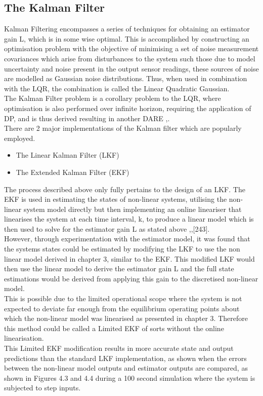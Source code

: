 \documentclass[12pt,a4paper,twoside]{report}
\begin{document}
			\subsection*{The Kalman Filter}
				
				Kalman Filtering encompasses a series of techniques for obtaining an estimator gain L, which is in some wise optimal. This is accomplished by constructing an optimisation problem with the objective of minimising a set of noise measurement covariances which arise from disturbances to the system such those due to model uncertainty and noise present in the output sensor readings, these sources of noise are modelled as Gaussian noise distributions. Thus, when used in combination with the LQR, the combination is called the Linear Quadratic Gaussian.  
				\\
				The Kalman Filter problem is a corollary problem to the LQR, where optimisation is also performed over infinite horizon, requiring the application of DP, and is thus derived resulting in another DARE \cite{18},\cite{21}.
				\\
				There are 2 major implementations of the Kalman filter which are popularly employed.
					
				\begin{itemize}
					\item 
						The Linear Kalman Filter (LKF)
					\item 
						The Extended Kalman Filter (EKF)
				\end{itemize} 
				\space
				The process described above only fully pertains to the design of an LKF. The EKF is used in estimating the states of non-linear systems, utilising the non-linear system model directly but then implementing an online lineariser that linearises the system at each time interval, k, to produce a linear model which is then used to solve for the estimator gain L as stated above \cite{21},\cite{22},[243].
				\\
				However, through experimentation with the estimator model, it was found that the systems states could be estimated by modifying the LKF to use the non linear model derived in chapter 3, similar to the EKF. This modified LKF would then use the linear model to derive the estimator gain L and the full state estimations would be derived from applying this gain to the discretised non-linear model.
				\\
				This is possible due to the limited operational scope where the system is not expected to deviate far enough from the equilibrium operating points about which the non-linear model was linearised as presented in chapter 3. Therefore this method could be called a Limited EKF of sorts without the online linearisation.
				\\
				This Limited EKF modification results in more accurate state and output predictions than the standard LKF implementation, as shown when the errors between the non-linear model outputs and estimator outputs are compared, as shown in Figures 4.3 and 4.4 during a 100 second simulation where the system is subjected to step inputs. 
					
\end{document}
